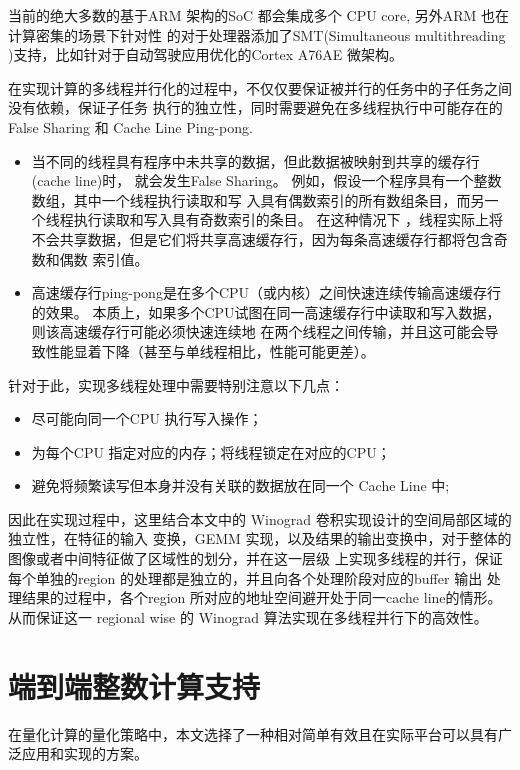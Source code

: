 当前的绝大多数的基于ARM 架构的SoC 都会集成多个 CPU core, 另外ARM 也在计算密集的场景下针对性
的对于处理器添加了SMT(Simultaneous multithreading )支持，比如针对于自动驾驶应用优化的Cortex 
A76AE 微架构。

在实现计算的多线程并行化的过程中，不仅仅要保证被并行的任务中的子任务之间没有依赖，保证子任务
执行的独立性，同时需要避免在多线程执行中可能存在的 False Sharing 和 Cache Line Ping-pong.

\begin{itemize}
  \item 当不同的线程具有程序中未共享的数据，但此数据被映射到共享的缓存行(cache line)时，
  就会发生False Sharing。 例如，假设一个程序具有一个整数数组，其中一个线程执行读取和写
  入具有偶数索引的所有数组条目，而另一个线程执行读取和写入具有奇数索引的条目。 在这种情况下
  ，线程实际上将不会共享数据，但是它们将共享高速缓存行，因为每条高速缓存行都将包含奇数和偶数
  索引值。
  \item 高速缓存行ping-pong是在多个CPU（或内核）之间快速连续传输高速缓存行的效果。
  本质上，如果多个CPU试图在同一高速缓存行中读取和写入数据，则该高速缓存行可能必须快速连续地
  在两个线程之间传输，并且这可能会导致性能显着下降（甚至与单线程相比，性能可能更差）。
\end{itemize}

针对于此，实现多线程处理中需要特别注意以下几点：

\begin{itemize}
    \item 尽可能向同一个CPU 执行写入操作；
    \item 为每个CPU 指定对应的内存；将线程锁定在对应的CPU；
    \item 避免将频繁读写但本身并没有关联的数据放在同一个 Cache Line 中;
\end{itemize}

因此在实现过程中，这里结合本文中的 Winograd 卷积实现设计的空间局部区域的独立性，在特征的输入
变换，GEMM 实现，以及结果的输出变换中，对于整体的图像或者中间特征做了区域性的划分，并在这一层级
上实现多线程的并行，保证每个单独的region 的处理都是独立的，并且向各个处理阶段对应的buffer 输出
处理结果的过程中，各个region 所对应的地址空间避开处于同一cache line的情形。从而保证这一 regional wise
的 Winograd 算法实现在多线程并行下的高效性。


\section{端到端整数计算支持}

在量化计算的量化策略中，本文选择了一种相对简单有效且在实际平台可以具有广泛应用和实现的方案。


